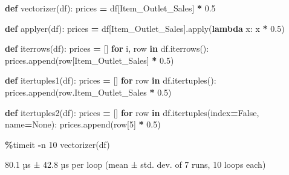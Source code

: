 \documentclass[
]{book}
\newenvironment{Shaded}{\begin{snugshade}}{\end{snugshade}}
\newcommand{\BuiltInTok}[1]{#1}
\newcommand{\ControlFlowTok}[1]{\textcolor[rgb]{0.13,0.29,0.53}{\textbf{#1}}}
\newcommand{\DecValTok}[1]{\textcolor[rgb]{0.00,0.00,0.81}{#1}}
\newcommand{\FloatTok}[1]{\textcolor[rgb]{0.00,0.00,0.81}{#1}}
\newcommand{\KeywordTok}[1]{\textcolor[rgb]{0.13,0.29,0.53}{\textbf{#1}}}
\newcommand{\NormalTok}[1]{#1}
\newcommand{\OperatorTok}[1]{\textcolor[rgb]{0.81,0.36,0.00}{\textbf{#1}}}
\newcommand{\StringTok}[1]{\textcolor[rgb]{0.31,0.60,0.02}{#1}}
\newcommand{\VariableTok}[1]{\textcolor[rgb]{0.00,0.00,0.00}{#1}}
\begin{document}
\begin{Shaded}
\begin{Highlighting}[]

\KeywordTok{def}\NormalTok{ vectorizer(df):}
\NormalTok{    prices }\OperatorTok{=}\NormalTok{ df[}\StringTok{\textquotesingle{}Item\_Outlet\_Sales\textquotesingle{}}\NormalTok{] }\OperatorTok{*} \FloatTok{0.5}

\KeywordTok{def}\NormalTok{ applyer(df):}
\NormalTok{    prices }\OperatorTok{=}\NormalTok{ df[}\StringTok{\textquotesingle{}Item\_Outlet\_Sales\textquotesingle{}}\NormalTok{].}\BuiltInTok{apply}\NormalTok{(}\KeywordTok{lambda}\NormalTok{ x: x }\OperatorTok{*} \FloatTok{0.5}\NormalTok{)}

\KeywordTok{def}\NormalTok{ iterrows(df):}
\NormalTok{    prices }\OperatorTok{=}\NormalTok{ []}
    \ControlFlowTok{for}\NormalTok{ i, row }\KeywordTok{in}\NormalTok{ df.iterrows():}
\NormalTok{        prices.append(row[}\StringTok{\textquotesingle{}Item\_Outlet\_Sales\textquotesingle{}}\NormalTok{] }\OperatorTok{*} \FloatTok{0.5}\NormalTok{)}

\KeywordTok{def}\NormalTok{ itertuples1(df):}
\NormalTok{    prices }\OperatorTok{=}\NormalTok{ []}
    \ControlFlowTok{for}\NormalTok{ row }\KeywordTok{in}\NormalTok{ df.itertuples():}
\NormalTok{        prices.append(row.Item\_Outlet\_Sales }\OperatorTok{*} \FloatTok{0.5}\NormalTok{)}

\KeywordTok{def}\NormalTok{ itertuples2(df):}
\NormalTok{    prices }\OperatorTok{=}\NormalTok{ []}
    \ControlFlowTok{for}\NormalTok{ row }\KeywordTok{in}\NormalTok{ df.itertuples(index}\OperatorTok{=}\VariableTok{False}\NormalTok{, name}\OperatorTok{=}\VariableTok{None}\NormalTok{):}
\NormalTok{        prices.append(row[}\DecValTok{5}\NormalTok{] }\OperatorTok{*} \FloatTok{0.5}\NormalTok{)}
\end{Highlighting}
\end{Shaded}

\begin{Shaded}
\begin{Highlighting}[]
\OperatorTok{\%}\NormalTok{timeit }\OperatorTok{{-}}\NormalTok{n }\DecValTok{10}\NormalTok{ vectorizer(df)}
\end{Highlighting}
\end{Shaded}

\begin{Shaded}
\begin{Highlighting}[]
\NormalTok{80.1 µs ± 42.8 µs per loop (mean ± std. dev. of 7 runs, 10 loops each)}
\end{Highlighting}
\end{Shaded}
\end{document}
